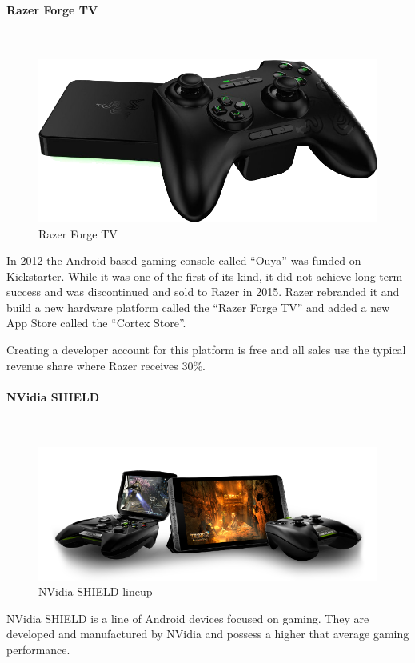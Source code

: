 \paragraph{Razer Forge TV}\mbox{}\\
\begin{figure}[!hbp]
\includegraphics[width=\linewidth]{img/razer.png}
\centering
\caption{ Razer Forge TV }
\label{fig:razer}
\end{figure}
In 2012 the Android-based gaming console called “Ouya” was funded on Kickstarter. \citep{ouya_2016} While it was one of the first of its kind, it did not achieve long term success and was discontinued and sold to Razer in 2015. Razer rebranded it and build a new hardware platform called the “Razer Forge TV” and added a new App Store called the “Cortex Store”. \citep{razer_2016}

Creating a developer account for this platform is free and all sales use the typical revenue share where Razer receives 30\%.

\paragraph{NVidia SHIELD}\mbox{}\\
\begin{figure}[!hbp]
\includegraphics[width=\linewidth]{img/shield.png}
\centering
\caption{ NVidia SHIELD lineup }
\label{fig:shield}
\end{figure}
NVidia SHIELD is a line of Android devices focused on gaming. They are developed and manufactured by NVidia and possess a higher that average gaming performance. 

